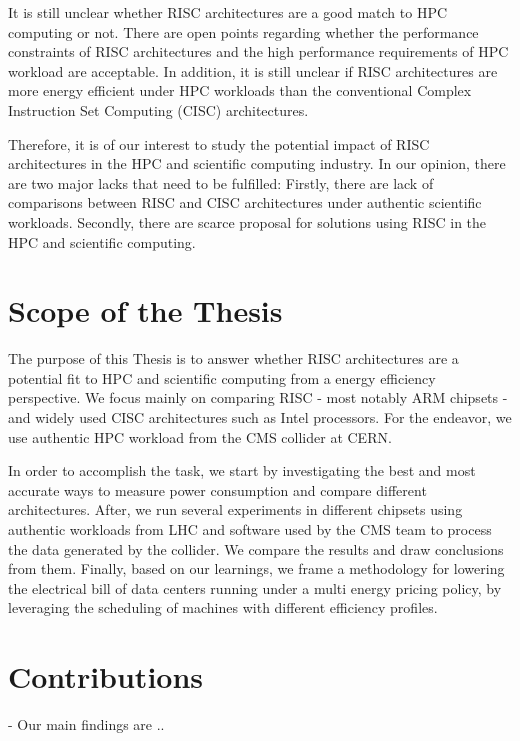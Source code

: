 It is still unclear whether RISC architectures are a good match to HPC
computing or not. There are open points regarding whether the performance 
constraints of RISC architectures and the high performance requirements of HPC 
workload are acceptable. In addition, it is still unclear if RISC architectures
are more energy efficient under HPC workloads than the conventional Complex 
Instruction Set Computing (CISC) architectures.

Therefore, it is of our interest to study the potential impact of RISC architectures in 
the HPC and scientific computing industry. In our opinion, there are two major
lacks that need to be fulfilled: Firstly, there are lack of comparisons between
RISC and CISC architectures under authentic scientific workloads. Secondly,
there are scarce proposal for solutions using RISC in the HPC and scientific
computing.
 

\section{Scope of the Thesis}
The purpose of this Thesis is to answer whether RISC architectures
are a potential fit to HPC and scientific computing from a energy efficiency
perspective. We focus mainly on comparing RISC - most notably ARM chipsets - and
widely used CISC architectures such as Intel processors. For the endeavor, we
use authentic HPC workload from the CMS collider at CERN. 

In order to accomplish the task, we start by investigating the best
and most accurate ways to measure power consumption and compare different
architectures. After, we run several experiments in different chipsets using
authentic workloads from LHC and software used by the CMS team to process the
data generated by the collider. We compare the results and
draw conclusions from them. Finally, based on our learnings, we frame a methodology for
lowering the electrical bill of data centers running under a multi energy
pricing policy, by leveraging the scheduling of machines with different
efficiency profiles.  

   
\section{Contributions}
- Our main findings are ..

